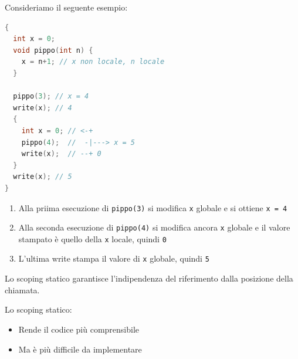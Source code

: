\documentclass[a4paper]{article}
\begin{document}
\begin{example}
  Consideriamo il seguente esempio:
\begin{lstlisting}[language=c]
{
  int x = 0;
  void pippo(int n) {
    x = n+1; // x non locale, n locale
  }
  
  pippo(3); // x = 4
  write(x); // 4
  {
    int x = 0; // <-+
    pippo(4);  //  -|---> x = 5
    write(x);  // --+ 0
  }
  write(x); // 5
}
\end{lstlisting}
  \begin{enumerate}
    \item Alla priima esecuzione di \texttt{pippo(3)} si modifica \texttt{x} globale
      e si ottiene \texttt{x = 4}

    \item Alla seconda esecuzione di \texttt{pippo(4)} si modifica ancora \texttt{x}
      globale e il valore stampato è quello della \texttt{x} locale, quindi
      \texttt{0}

    \item L'ultima write stampa il valore di \texttt{x} globale, quindi \texttt{5}
  \end{enumerate}
\end{example}
\begin{definition}
  Lo scoping statico garantisce l'indipendenza del riferimento dalla posizione della
  chiamata.
\end{definition}
Lo scoping statico:
\begin{itemize}
  \item Rende il codice più comprensibile
  \item Ma è più difficile da implementare
\end{itemize}
\end{document}

